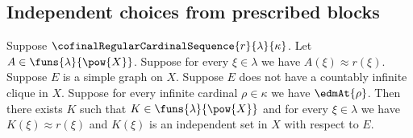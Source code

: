 \subsection{Independent choices from prescribed blocks}

\begin{theorem}\label{singular_independent_block_family}
    Suppose $\cofinalRegularCardinalSequence{r}{\lambda}{\kappa}$.
    Let $A\in\funs{\lambda}{\pow{X}}$.
    Suppose for every $\xi\in\lambda$ we have $A(\xi)\approx r(\xi)$.
    Suppose $E$ is a simple graph on $X$.
    Suppose $E$ does not have a countably infinite clique in $X$.
    Suppose for every infinite cardinal $\rho\in\kappa$ we have $\edmAt{\rho}$.
    Then there exists $K$ such that
        $K\in\funs{\lambda}{\pow{X}}$ and for every $\xi\in\lambda$
        we have $K(\xi)\approx r(\xi)$ and
            $K(\xi)$ is an independent set in $X$ with respect to $E$.
\end{theorem}
